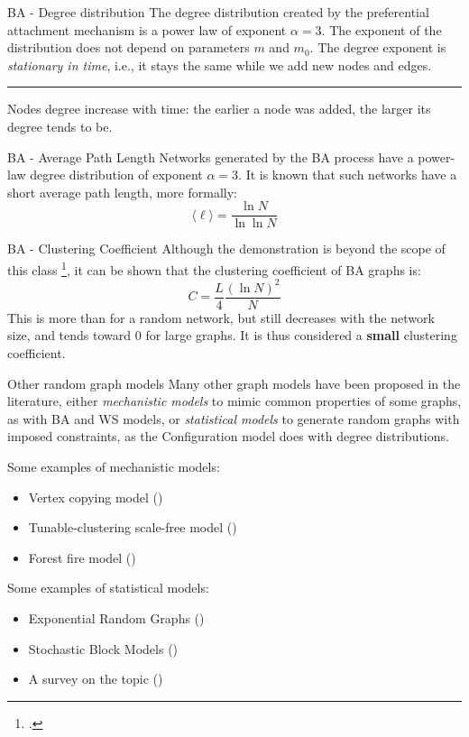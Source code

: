 \begin{textbox}{BA - Degree distribution }
    The degree distribution created by the preferential attachment mechanism is a power law of exponent $ \alpha=3$. The exponent of the distribution does not depend on parameters $m$ and $m_0$. The degree exponent is \textit{stationary in time}, i.e., it stays the same while we add new nodes and edges.

    \noindent\rule{4cm}{0.1pt}

    Nodes degree increase with time: the earlier a node was added, the larger its degree tends to be. %
\end{textbox}


\begin{textbox}{BA - Average Path Length }
    Networks generated by the BA process have a power-law degree distribution of exponent $ \alpha=3$. It is known that such networks have a short average path length, more formally:
    \[
        \langle \ell \rangle=\frac{\ln N}{\ln \ln N}
    \]
\end{textbox}


\begin{textbox}{BA - Clustering Coefficient }
    Although the demonstration is beyond the scope of this class \footcite{barabasi1999emergence}, it can be shown that the clustering coefficient of BA graphs is:
    \[
        C=\frac{L}{4}\frac{(\ln N)^2}{N}
    \]
    This is more than for a random network, but still decreases with the network size, and tends toward 0 for large graphs. It is thus considered a \textbf{small} clustering coefficient.
\end{textbox}


\begin{textbox}{Other random graph models }
    Many other graph models have been proposed in the literature, either \textit{mechanistic models} to mimic common properties of some graphs, as with BA and WS models, or \textit{statistical models} to generate random graphs with imposed constraints, as the Configuration model does with degree distributions.

    Some examples of mechanistic models:
    \begin{itemize}
        \item Vertex copying model (\cite{kleinberg1999web})
        \item Tunable-clustering scale-free model (\cite{holme2002growing})
        \item Forest fire model (\cite{leskovec2005graphs})
    \end{itemize}

    Some examples of statistical models:
    \begin{itemize}
        \item Exponential Random Graphs (\cite{robins2007introduction})
        \item Stochastic Block Models (\cite{peixoto2019bayesian})
        \item A survey on the topic (\cite{orbanz2014bayesian})
    \end{itemize}
\end{textbox}

